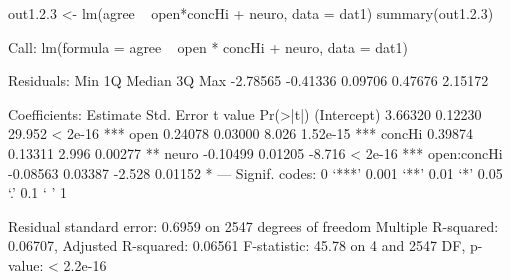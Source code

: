 \begin{Schunk}
\begin{Sinput}
 out1.2.3 <- lm(agree ~ open*concHi + neuro, data = dat1)
 summary(out1.2.3)
\end{Sinput}
\begin{Soutput}
Call:
lm(formula = agree ~ open * concHi + neuro, data = dat1)

Residuals:
     Min       1Q   Median       3Q      Max 
-2.78565 -0.41336  0.09706  0.47676  2.15172 

Coefficients:
            Estimate Std. Error t value Pr(>|t|)    
(Intercept)  3.66320    0.12230  29.952  < 2e-16 ***
open         0.24078    0.03000   8.026 1.52e-15 ***
concHi       0.39874    0.13311   2.996  0.00277 ** 
neuro       -0.10499    0.01205  -8.716  < 2e-16 ***
open:concHi -0.08563    0.03387  -2.528  0.01152 *  
---
Signif. codes:  0 ‘***’ 0.001 ‘**’ 0.01 ‘*’ 0.05 ‘.’ 0.1 ‘ ’ 1

Residual standard error: 0.6959 on 2547 degrees of freedom
Multiple R-squared:  0.06707,	Adjusted R-squared:  0.06561 
F-statistic: 45.78 on 4 and 2547 DF,  p-value: < 2.2e-16
\end{Soutput}
\end{Schunk}
